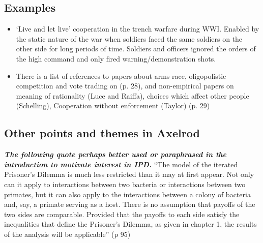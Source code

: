 \subsection{Examples}

\begin{itemize}
\item`Live and let live' cooperation in the trench warfare during WWI. Enabled by the static nature of the war when soldiers faced the same soldiers on the other side for long periods of time. Soldiers and officers ignored the orders of the high command and only fired warning/demonstration shots.
\item There is a list of references to papers about arms race, oligopolistic competition and vote trading on (p. 28), and non-empirical papers on meaning of rationality (Luce and Raiffa), choices which affect other people (Schelling), Cooperation without enforcement (Taylor) (p. 29)

\end{itemize}


\subsection{Other points and themes in Axelrod}
\textit{\textbf{The following quote perhaps better used or paraphrased in the introduction to motivate interest in IPD.}} ``The model of the iterated Prisoner's Dilemma is much less restricted than it may at first appear. Not only can it apply to interactions between two bacteria or interactions between two primates, but it can also apply to the interactions between a colony of bacteria and, say, a primate serving as a host. There is no assumption that payoffs of the two sides are comparable. Provided that the payoffs to each side satisfy the inequalities that define the Prisoner's Dilemma, as given in chapter 1, the results of the analysis will be applicable'' (p 95)

